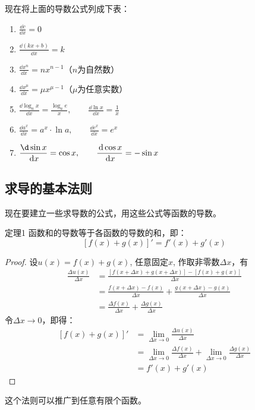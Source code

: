 现在将上面的导数公式列成下表：
\begin{enumerate}
    \item $\frac{\dd c}{\dd x}=0$
    \item $\frac{\dd(kx+b)}{\dd x}=k$
    \item $\frac{\dd x^n}{\dd x}=nx^{n-1}$\quad （$n$为自然数）
    \item $\frac{\dd x^\mu}{\dd x}=\mu x^{\mu-1}$\quad （$\mu$为任意实数）
    \item $\frac{\dd\log_a x}{\dd x}=\frac{\log_a e}{x},\qquad \frac{\dd \ln x}{\dd x}=\frac{1}{x}$
    \item $\frac{\dd a^x}{\dd x}=a^x\cdot \ln a,\qquad \frac{\dd e^x}{\dd x}=e^x$
    \item $\frac{\d\sin x}{\dd x}=\cos x,\qquad \frac{\dd \cos x}{\dd x}=-\sin x$
\end{enumerate}

\subsection{求导的基本法则}

现在要建立一些求导数的公式，用这些公式等函数的导数。

\begin{blk}
{定理1} 函数和的导数等于各函数的导数的和，即：
\[[f (x) +g (x) ] '=f' (x) +g' (x)\] 
\end{blk}

\begin{proof}
    设$u(x)=f(x)+g(x)$, 任意固定$x$, 作取非零数$\Delta x$，有 
\[\begin{split}
    \frac{\Delta u(x)}{\Delta x}&=\frac{[f(x+\Delta x)+g(x+\Delta x)]-[f(x)+g(x)]}{\Delta x}\\
    &=\frac{f(x+\Delta x)-f(x)}{\Delta x}+\frac{g(x+\Delta x)-g(x)}{\Delta x}\\
    &=\frac{\Delta f(x)}{\Delta x}+\frac{\Delta g(x)}{\Delta x}
\end{split}\]
令$\Delta x\to 0$，即得：
\[\begin{split}
    [f(x)+g(x)]'&=\lim_{\Delta x\to 0}\frac{\Delta u(x)}{\Delta x}\\
    &=\lim_{\Delta x\to 0}\frac{\Delta f(x)}{\Delta x}+\lim_{\Delta x\to 0}\frac{\Delta g(x)}{\Delta x}\\
    &=f'(x)+g'(x)
\end{split}\]
\end{proof}

这个法则可以推广到任意有限个函数。

